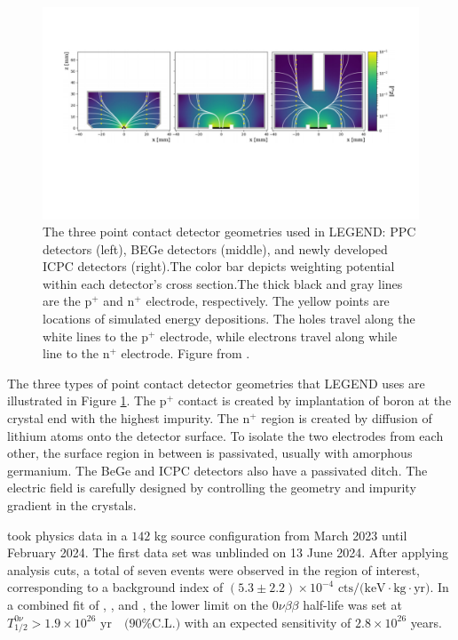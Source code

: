 \begin{figure}[!htb]
  \includegraphics[trim=15 30 15 20,clip,width=\linewidth]{ch2/figs/Det-geo-2.pdf}
\caption{The three point contact detector geometries used in LEGEND: {\MJD} PPC detectors (left), {\Gerda} BEGe detectors (middle), and newly developed ICPC detectors (right).The color bar depicts weighting potential within each detector's cross section.The thick black and gray lines are the p$^+$ and n$^+$ electrode, respectively. The yellow points are locations of simulated energy depositions. The holes travel along the white lines to the p$^+$ electrode, while electrons travel along while line to the n$^+$ electrode. Figure from \cite{Comellato:2020ljj}.}
\label{fig:det-compare}
  \end{figure}
  
The three types of point contact detector geometries that LEGEND uses are illustrated in Figure \ref{fig:det-compare}. The p$^+$ contact is created by implantation of boron at the crystal end with the highest impurity. The n$^+$ region is created by diffusion of lithium atoms onto the detector surface. To isolate the two electrodes from each other, the surface region in between is passivated, usually with amorphous germanium. The BeGe and ICPC detectors also have a passivated ditch. The electric field is carefully designed by controlling the geometry and impurity gradient in the crystals. 


{\Ltwo} took physics data in a $142$ kg source configuration from March 2023 until February 2024. The first data set was unblinded on 13 June 2024. After applying analysis cuts, a total of seven events were observed in the region of interest, corresponding to a background index of $ (5.3 \pm 2.2) \times 10^{-4} \text{ cts/(keV$\cdot$kg$\cdot$yr)}$. In a combined fit of {\Gerda}, {\MJD}, and {\Ltwo}, the lower limit on the 0$\nu\beta\beta$ half-life was set at $T^{0\nu}_{1/2} > 1.9 \times 10^{26} \text{ yr} \quad \text{(90\% C.L.)}$ with an expected sensitivity of $2.8 \times 10^{26}$ years. \cite{Pertoldi2024}

